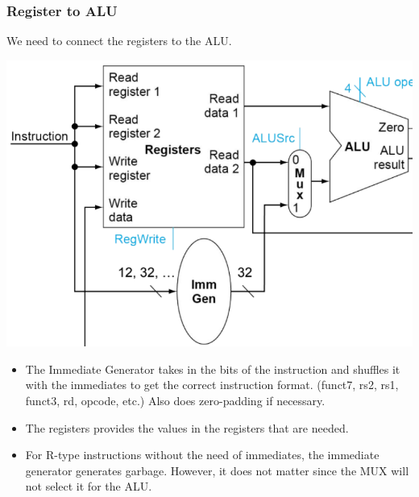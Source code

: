 \documentclass[10pt]{article}
\begin{document}
\subsubsection*{Register to ALU}
We need to connect the registers to the ALU.
\begin{center}
    \includegraphics*[scale=0.6]{W2_9.png}
\end{center}
\begin{itemize}
    \item The Immediate Generator takes in the bits of the instruction and shuffles it with the immediates to get the correct instruction format.  (funct7, rs2, rs1, funct3, rd, opcode, etc.)  Also does zero-padding if necessary.
    \item The registers provides the values in the registers that are needed.
    \item For R-type instructions without the need of immediates, the immediate generator generates garbage.  However, it does not matter since the MUX will not select it for the ALU.
\end{itemize}
\end{document}
